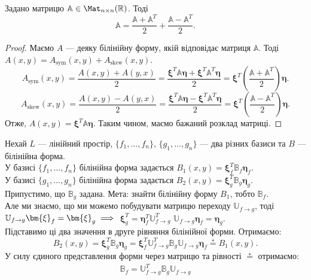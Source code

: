 \documentclass{math_library}
\begin{document}
\begin{corollary}
Задано матрицю $\mathbb{A} \in \Mat_{n \times n}(\mathbb{R})$. Тоді 
\[
\mathbb{A} = \dfrac{\mathbb{A} + \mathbb{A}^T}{2} + \dfrac{\mathbb{A} - \mathbb{A}^T}{2}.
\]
\end{corollary}

\begin{proof}
Маємо $A$ --- деяку білінійну форму, якій відповідає матриця $\mathbb{A}$. Тоді $A(x,y) = A_{\text{sym}}(x,y) + A_{\text{skew}}(x,y)$.
\[
A_{\text{sym}}(x,y) = \dfrac{A(x,y) + A(y,x)}{2} = \dfrac{\bm{\xi}^T \mathbb{A} \bm{\eta} + \bm{\xi}^T \mathbb{A}^T \bm{\eta}}{2} = \bm{\xi}^T \left( \dfrac{\mathbb{A} + \mathbb{A}^T}{2} \right) \bm{\eta}.
\]
\[
A_{\text{skew}}(x,y) = \dfrac{A(x,y) - A(y,x)}{2} = \dfrac{\bm{\xi}^T \mathbb{A} \bm{\eta} - \bm{\xi}^T \mathbb{A}^T \bm{\eta}}{2} = \bm{\xi}^T \left( \dfrac{\mathbb{A} - \mathbb{A}^T}{2} \right) \bm{\eta}.
\]
Отже, $A(x,y) = \bm{\xi}^T \mathbb{A} \bm{\eta}$. Таким чином, маємо бажаний розклад матриці.
\end{proof}
\noindent
Нехай $L$ --- лінійний простір, $\{f_1,\dots,f_n\}$, $\{g_1,\dots,g_n\}$ --- два різних базиси та $B$ --- білінійна форма.\\
У базисі $\{f_1,\dots,f_n\}$ білінійна форма задається $B_1(x,y) = \bm{\xi}^T_f \mathbb{B}_f \bm{\eta}_f$.\\
У базисі $\{g_1,\dots,g_n\}$ білінійна форма задається $B_2(x,y) = \bm{\xi}^T_g \mathbb{B}_g \bm{\eta}_g$.\\
Припустимо, що $\mathbb{B}_g$ задана. Мета: знайти білінійну форму $B_1$, тобто $\mathbb{B}_f$.\\
Але ми знаємо, що ми можемо побудувати матрицю переходу $\mathbb{U}_{f \to g}$, тоді $\mathbb{U}_{f \to g} \bm{\xi}_f = \bm{\xi}_g \implies \\ $ 
$\bm{\xi}_g^T = \bm{\eta}_f^T \mathbb{U}_{f \to g}^T$ \qquad $\mathbb{U}_{f \to g} \bm{\eta}_f = \bm{\eta}_g$.\\
Підставимо ці два значення в друге рівняння білінійної форми. Отримаємо:
\[
B_2(x,y) = \bm{\xi}_g^T \mathbb{B}_g \bm{\eta}_g = \bm{\xi}_f^T \mathbb{U}^T_{f \to g} \mathbb{B}_g \mathbb{U}_{f \to g} \bm{\eta}_f \overset{*}{=} B_1(x,y).
\]
У силу єдиного представлення форми через матрицю та рівності $\overset{*}{=}$ отримаємо:
\begin{align*}
\mathbb{B}_f = \mathbb{U}^T_{f \to g} \mathbb{B}_g \mathbb{U}_{f \to g}
\end{align*}
\end{document}
